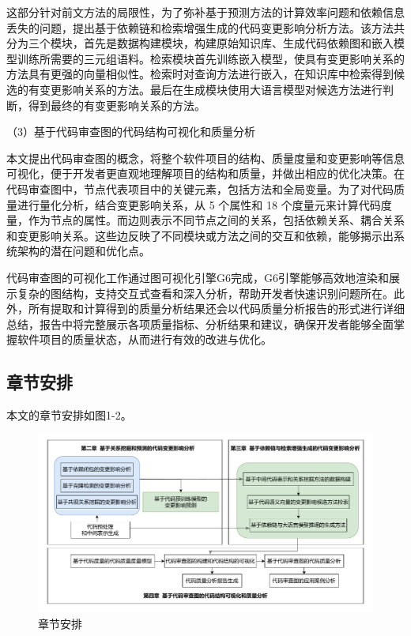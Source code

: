 这部分针对前文方法的局限性，为了弥补基于预测方法的计算效率问题和依赖信息丢失的问题，提出基于依赖链和检索增强生成的代码变更影响分析方法。该方法共分为三个模块，首先是数据构建模块，构建原始知识库、生成代码依赖图和嵌入模型训练所需要的三元组语料。检索模块首先训练嵌入模型，使具有变更影响关系的方法具有更强的向量相似性。检索时对查询方法进行嵌入，在知识库中检索得到候选的有变更影响关系的方法。最后在生成模块使用大语言模型对候选方法进行判断，得到最终的有变更影响关系的方法。

（3）基于代码审查图的代码结构可视化和质量分析

本文提出代码审查图的概念，将整个软件项目的结构、质量度量和变更影响等信息可视化，便于开发者更直观地理解项目的结构和质量，并做出相应的优化决策。在代码审查图中，节点代表项目中的关键元素，包括方法和全局变量。为了对代码质量进行量化分析，结合变更影响关系，从 5 个属性和 18 个度量元来计算代码度量，作为节点的属性。而边则表示不同节点之间的关系，包括依赖关系、耦合关系和变更影响关系。这些边反映了不同模块或方法之间的交互和依赖，能够揭示出系统架构的潜在问题和优化点。

代码审查图的可视化工作通过图可视化引擎G6完成，G6引擎能够高效地渲染和展示复杂的图结构，支持交互式查看和深入分析，帮助开发者快速识别问题所在。此外，所有提取和计算得到的质量分析结果还会以代码质量分析报告的形式进行详细总结，报告中将完整展示各项质量指标、分析结果和建议，确保开发者能够全面掌握软件项目的质量状态，从而进行有效的改进与优化。

\subsection{章节安排}

本文的章节安排如图1-2。

\begin{figure}[h]
\centering
\includegraphics[width = 1.0\textwidth]{figures/1_章节安排.pdf}
\caption{章节安排}
\end{figure}

